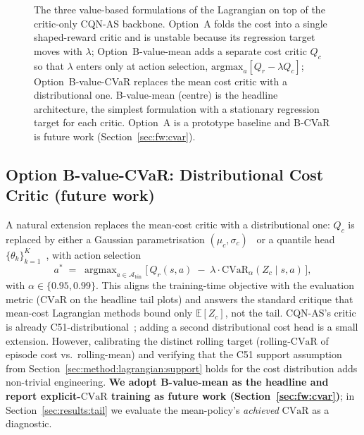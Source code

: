 \documentclass[11pt,a4paper]{report}
\newcommand{\cvar}{\ensuremath{\mathrm{CVaR}}}
\newcommand{\cqnas}{CQN-AS}
\begin{document}
\begin{figure}[h]
{%
}
\caption{The three value-based formulations of the Lagrangian on top
of the critic-only \cqnas{} backbone. Option~A folds the cost into a
single shaped-reward critic and is unstable because its regression
target moves with $\lambda$; Option~B-value-mean adds a separate cost
critic $Q_c$ so that $\lambda$ enters only at action selection,
$\mathrm{argmax}_a[Q_r - \lambda Q_c]$; Option~B-value-CVaR replaces
the mean cost critic with a distributional one. B-value-mean (centre)
is the headline architecture, the simplest formulation with a
stationary regression target for each critic. Option~A is a prototype
baseline and B-CVaR is future work (Section~\ref{sec:fw:cvar}).}
\label{fig:lagrangian-architectures}
\end{figure}

\subsection{Option B-value-CVaR: Distributional Cost Critic (future work)}
\label{sec:method:lagrangian:Bcvar}

A natural extension replaces the mean-cost critic with a
distributional one: $Q_c$ is replaced by either a Gaussian
parametrisation $(\mu_c, \sigma_c)$~\cite{yang2021wcsac} or a
quantile head $\{\theta_k\}_{k=1}^K$~\cite{dabney2018qrdqn}, with
action selection
\begin{equation}
  a^* \;=\; \mathop{\mathrm{argmax}}_{a \in \mathcal{A}_{\mathrm{bin}}}
  \Big[\,Q_r(s,a) \;-\; \lambda \cdot \cvar_{\alpha}(Z_c \mid s, a)\,\Big],
\end{equation}
with $\alpha \in \{0.95, 0.99\}$. This aligns the training-time
objective with the evaluation metric (\cvar{} on the headline tail
plots) and answers the standard critique that mean-cost Lagrangian
methods bound only $\mathbb{E}[Z_c]$, not the tail. \cqnas{}'s
critic is already C51-distributional~\cite{bellemare2017c51};
adding a second distributional cost head is a small extension.
However, calibrating the distinct rolling target (rolling-\cvar{}
of episode cost vs.\ rolling-mean) and verifying that the C51
support assumption from Section~\ref{sec:method:lagrangian:support}
holds for the cost distribution adds non-trivial engineering.
\textbf{We adopt B-value-mean as the headline and report
explicit-\cvar{} training as future work
(Section~\ref{sec:fw:cvar})}; in
Section~\ref{sec:results:tail} we evaluate the mean-policy's
\emph{achieved} \cvar{} as a diagnostic.
\end{document}
